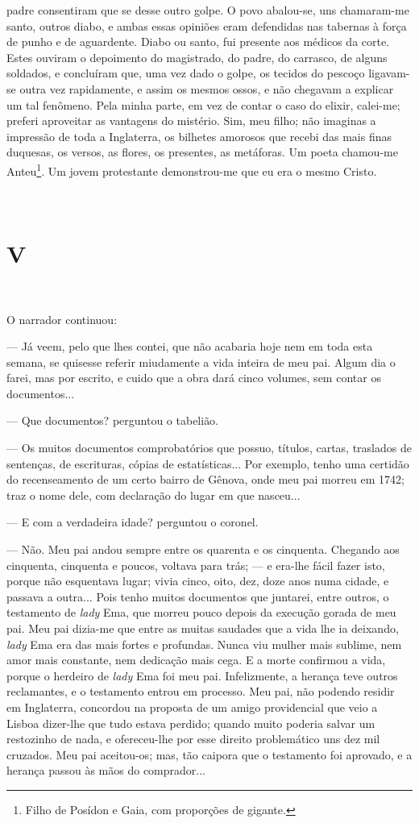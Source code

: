 padre consentiram que se desse outro golpe. O povo abalou-se, uns
chamaram-me santo, outros diabo, e ambas essas opiniões eram defendidas
nas tabernas à força de punho e de aguardente. Diabo ou santo, fui
presente aos médicos da corte. Estes ouviram o depoimento do magistrado,
do padre, do carrasco, de alguns soldados, e concluíram que, uma vez
dado o golpe, os tecidos do pescoço ligavam-se outra vez rapidamente, e
assim os mesmos ossos, e não chegavam a explicar um tal fenômeno. Pela
minha parte, em vez de contar o caso do elixir, calei-me; preferi
aproveitar as vantagens do mistério. Sim, meu filho; não imaginas a
impressão de toda a Inglaterra, os bilhetes amorosos que recebi das mais
finas duquesas, os versos, as flores, os presentes, as metáforas. Um
poeta chamou-me Anteu\footnote{Filho de Posídon e Gaia, com proporções
  de gigante.}. Um jovem protestante demonstrou-me que eu era o mesmo
Cristo.

~~

\section{V}

~

O narrador continuou:

--- Já veem, pelo que lhes contei, que não acabaria hoje nem em toda
esta semana, se quisesse referir miudamente a vida inteira de meu pai.
Algum dia o farei, mas por escrito, e cuido que a obra dará cinco
volumes, sem contar os documentos...

--- Que documentos? perguntou o tabelião.

--- Os muitos documentos comprobatórios que possuo, títulos, cartas,
traslados de sentenças, de escrituras, cópias de estatísticas... Por
exemplo, tenho uma certidão do recenseamento de um certo bairro de
Gênova, onde meu pai morreu em 1742; traz o nome dele, com declaração do
lugar em que nasceu...

--- E com a verdadeira idade? perguntou o coronel.

--- Não. Meu pai andou sempre entre os quarenta e os cinquenta. Chegando
aos cinquenta, cinquenta e poucos, voltava para trás; --- e era-lhe
fácil fazer isto, porque não esquentava lugar; vivia cinco, oito, dez,
doze anos numa cidade, e passava a outra... Pois tenho muitos documentos
que juntarei, entre outros, o testamento de \emph{lady} Ema, que morreu
pouco depois da execução gorada de meu pai. Meu pai dizia-me que entre
as muitas saudades que a vida lhe ia deixando, \emph{lady} Ema era das
mais fortes e profundas. Nunca viu mulher mais sublime, nem amor mais
constante, nem dedicação mais cega. E a morte confirmou a vida, porque o
herdeiro de \emph{lady} Ema foi meu pai. Infelizmente, a herança teve
outros reclamantes, e o testamento entrou em processo. Meu pai, não
podendo residir em Inglaterra, concordou na proposta de um amigo
providencial que veio a Lisboa dizer-lhe que tudo estava perdido; quando
muito poderia salvar um restozinho de nada, e ofereceu-lhe por esse
direito problemático uns dez mil cruzados. Meu pai aceitou-os; mas, tão
caipora que o testamento foi aprovado, e a herança passou às mãos do
comprador...

